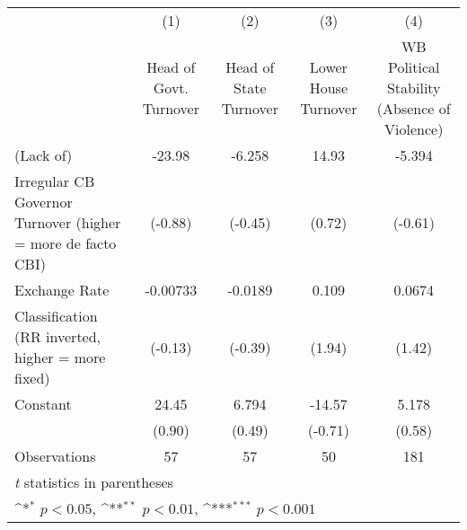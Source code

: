{
\def\sym#1{\ifmmode^{#1}\else\(^{#1}\)\fi}
\begin{tabular}{l*{4}{c}}
\toprule
                &\multicolumn{1}{c}{(1)}&\multicolumn{1}{c}{(2)}&\multicolumn{1}{c}{(3)}&\multicolumn{1}{c}{(4)}\\
                &\multicolumn{1}{c}{Head of Govt. Turnover}&\multicolumn{1}{c}{Head of State Turnover}&\multicolumn{1}{c}{Lower House Turnover}&\multicolumn{1}{c}{WB Political Stability (Absence of Violence)}\\
\midrule
(Lack of)       &   -23.98         &   -6.258         &    14.93         &   -5.394         \\
Irregular CB Governor Turnover (higher = more de facto CBI)&  (-0.88)         &  (-0.45)         &   (0.72)         &  (-0.61)         \\
\addlinespace
Exchange Rate   & -0.00733         &  -0.0189         &    0.109         &   0.0674         \\
Classification (RR inverted, higher = more fixed)&  (-0.13)         &  (-0.39)         &   (1.94)         &   (1.42)         \\
\addlinespace
Constant        &    24.45         &    6.794         &   -14.57         &    5.178         \\
                &   (0.90)         &   (0.49)         &  (-0.71)         &   (0.58)         \\
\midrule
Observations    &       57         &       57         &       50         &      181         \\
\bottomrule
\multicolumn{5}{l}{\footnotesize \textit{t} statistics in parentheses}\\
\multicolumn{5}{l}{\footnotesize \sym{*} \(p<0.05\), \sym{**} \(p<0.01\), \sym{***} \(p<0.001\)}\\
\end{tabular}
}
